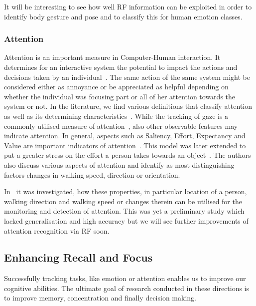 \documentclass[journal]{IEEEtran}
\begin{document}
\begin{figure*}
It will be interesting to see how well RF information can be exploited in order to identify body gesture and pose and to classify this for human emotion classes.

\subsubsection{Attention}
Attention is an important measure in Computer-Human interaction. 
It determines for an interactive system the potential to impact the actions and decisions taken by an individual~\cite{AttentionMonitoring_Xu_2012}.
The same action of the same system might be considered either as annoyance or be appreciated as helpful depending on whether the individual was focusing part or all of her attention towards the system or not.
In the literature, we find various definitions that classify attention as well as its determining characteristics~\cite{AttentionMonitoring_Wu_2007, AttentionMonitoring_Wickens_1984}.
While the tracking of gaze is a commonly utilised measure of attention~\cite{AttentionMonitoring_Yonezawa_2007}, also other observable features may indicate attention. 
In general, aspects such as Saliency, Effort, Expectancy and Value are important indicators of attention~\cite{AttentionMonitoring_Wickens_2008, AttentionMonitoring_Wickens_1984,AttentionMonitoring_Xu_2012,AttentionMonitoring_Gollan_2011}.
This model was later extended to put a greater stress on the effort a person takes towards an object~\cite{AttentionMonitoring_Ferscha_2012}.
The authors also discuss various aspects of attention and identify as most distinguishing factors changes in walking speed, direction or orientation.

In~\cite{Pervasive_Shi_2014} it was investigated, how these properties, in particular location of a person, walking direction and walking speed or changes therein can be utilised for the monitoring and detection of attention. 
This was yet a preliminary study which lacked generalisation and high accuracy but we will see further improvements of attention recognition via RF soon. 

\subsection{Enhancing Recall and Focus}
Successfully tracking tasks, like emotion or attention
enables us to improve our cognitive abilities.
The ultimate goal of research conducted in these directions is to improve memory, concentration and finally decision making.


\end{figure*}
\end{document}
